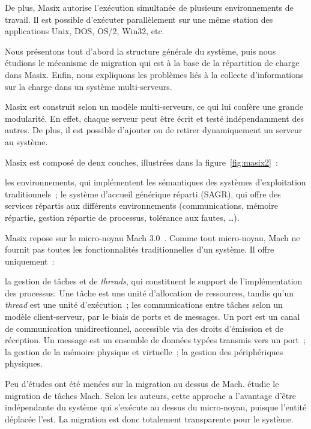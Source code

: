 \documentclass[11pt,a4paper]{article}
\begin{document}
De plus, Masix autorise l'exécution simultanée de plusieurs environnements de travail. Il est possible d'exécuter parallèlement sur une même station des applications Unix, DOS, OS/2, Win32, etc. 

Nous présentons tout d'abord la structure générale du système, puis nous
étudions le mécanisme de migration qui est à la base de la répartition de charge dans Masix. Enfin, nous expliquons les problèmes liés à la collecte d'informations sur la charge dans un système multi-serveurs.

Masix est construit selon un modèle multi-serveurs, ce qui lui confère une grande modularité. En effet, chaque serveur peut \^etre écrit et testé indépendamment des autres. De plus, il est possible d'ajouter ou de retirer dynamiquement un serveur au système.

Masix est composé de deux couches, illustrées dans la figure~\ref{fig:masix2}~:
\begin{itemize}
\myitem les environnements, qui implémentent les sémantiques des systèmes d'exploitation traditionnels~;
\myitem le système d'accueil générique réparti (SAGR), qui offre des services répartis aux différents environnements (communications, mémoire répartie, gestion répartie de processus, tolérance aux fautes, \dots).
\end{itemize}

Masix repose sur le micro-noyau Mach 3.0~\cite{mach:basis}. Comme tout micro-noyau, Mach ne fournit pas toutes les fonctionnalités traditionnelles d'un système. Il offre uniquement~:
\begin{itemize}
\myitem la gestion de t\^aches et de {\it threads}, qui constituent le support de l'implémentation des processus. Une t\^ache est une unité d'allocation de ressources, tandis qu'un {\it thread} est une unité d'exécution~; 
\myitem les communications entre t\^aches selon un modèle client-serveur, par le biais de ports et de messages. Un port est un canal de communication unidirectionnel, accessible via des droits d'émission et de réception. Un message est un ensemble de données typées transmis vers un port~;
\myitem la gestion de la mémoire physique et virtuelle~;
\myitem la gestion des périphériques physiques.
\end {itemize}

Peu d'études ont été menées sur la migration au dessus de Mach. \cite{mach:milo93sedms} étudie le migration de t\^aches Mach. Selon les auteurs, cette approche a l'avantage d'\^etre indépendante du système qui s'exécute au dessus du micro-noyau, puisque l'entité déplacée l'est. La migration est donc totalement transparente pour le système.
\end{document}
